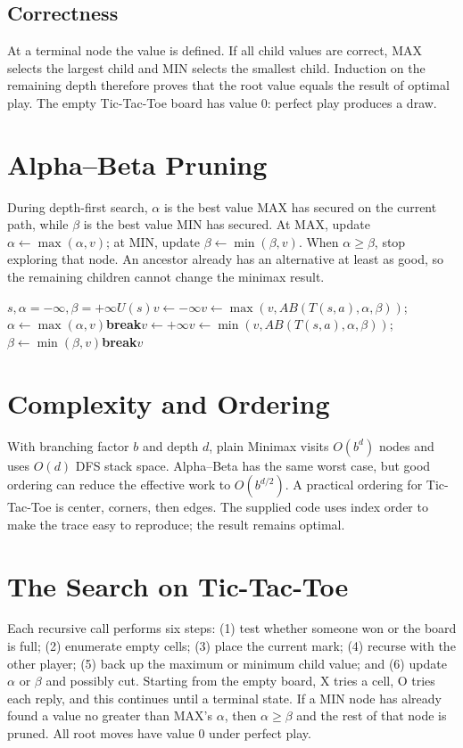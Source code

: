 \documentclass[conference]{IEEEtran}
\begin{document}
\subsection{Correctness}At a terminal node the value is defined. If all child values are correct, MAX selects the largest child and MIN selects the smallest child. Induction on the remaining depth therefore proves that the root value equals the result of optimal play. The empty Tic-Tac-Toe board has value $0$: perfect play produces a draw.
\section{Alpha--Beta Pruning}During depth-first search, $\alpha$ is the best value MAX has secured on the current path, while $\beta$ is the best value MIN has secured. At MAX, update $\alpha\leftarrow\max(\alpha,v)$; at MIN, update $\beta\leftarrow\min(\beta,v)$. When $\alpha\ge\beta$, stop exploring that node. An ancestor already has an alternative at least as good, so the remaining children cannot change the minimax result.\begin{algorithm}[h]\caption{Alpha--Beta Search}\begin{algorithmic}[1]\Require $s,\alpha=-\infty,\beta=+\infty$\State \Return $U(s)$\EndIf{}\State $v\gets-\infty$\State $v\gets\max(v,AB(T(s,a),\alpha,\beta))$; $\alpha\gets\max(\alpha,v)$\If{$\alpha\ge\beta$}\State \textbf{break}\EndIf\EndFor\Else\State $v\gets+\infty$\State $v\gets\min(v,AB(T(s,a),\alpha,\beta))$; $\beta\gets\min(\beta,v)$\If{$\alpha\ge\beta$}\State \textbf{break}\EndIf\EndFor\EndIf\State \Return $v$\end{algorithmic}\end{algorithm}
\section{Complexity and Ordering}With branching factor $b$ and depth $d$, plain Minimax visits $O(b^d)$ nodes and uses $O(d)$ DFS stack space. Alpha--Beta has the same worst case, but good ordering can reduce the effective work to $O(b^{d/2})$. A practical ordering for Tic-Tac-Toe is center, corners, then edges. The supplied code uses index order to make the trace easy to reproduce; the result remains optimal.
\section{The Search on Tic-Tac-Toe}Each recursive call performs six steps: (1) test whether someone won or the board is full; (2) enumerate empty cells; (3) place the current mark; (4) recurse with the other player; (5) back up the maximum or minimum child value; and (6) update $\alpha$ or $\beta$ and possibly cut. Starting from the empty board, X tries a cell, O tries each reply, and this continues until a terminal state. If a MIN node has already found a value no greater than MAX's $\alpha$, then $\alpha\ge\beta$ and the rest of that node is pruned. All root moves have value $0$ under perfect play.
\end{document}
